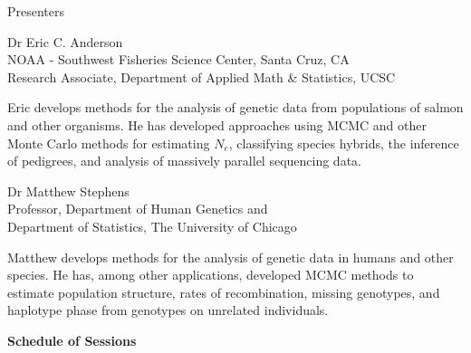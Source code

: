 
\vspace*{1in}
\begin{center}\color{section0}\bf\Large
\coursetitlepage
\end{center}
\es\bs

\begin{center}\color{section0} Presenters\end{center}
\enlargethispage*{1000pt}

{\small
{\color{section0}Dr Eric C. Anderson\\
NOAA - Southwest Fisheries Science Center, Santa Cruz, CA\\
Research Associate, Department of Applied Math \& Statistics, UCSC}

Eric develops methods for the analysis of genetic data from populations of salmon and other organisms.  He has developed approaches using MCMC and other Monte Carlo methods for estimating $N_e$, classifying species hybrids, the inference of pedigrees, and analysis of massively parallel sequencing data.

{\color{section0}Dr Matthew Stephens\\
Professor, Department of Human Genetics and\\
Department of Statistics, The University of Chicago}
  
Matthew develops methods for the analysis of genetic data in humans and other species. He has, among other applications, developed MCMC methods to estimate population structure, rates of recombination, missing genotypes, and haplotype phase from genotypes on unrelated individuals.

}

\es\bs
\begin{center}
{\color{section0}\bf\Large Schedule of Sessions}
\vspace*{.25in}
\enlargethispage*{1000pt}

%

%

\end{center}


